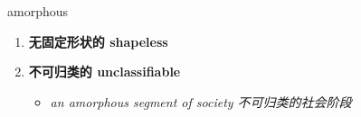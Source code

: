 
\begin{frame}
{\huge amorphous}
\begin{center}
\begin{enumerate}\Large
  \item \textbf{无固定形状的 shapeless}
  \item \textbf{不可归类的 unclassifiable}
  \begin{itemize}
    \item \em{\Large{an amorphous segment of society 不可归类的社会阶段}}
  \end{itemize}
\end{enumerate}
\end{center}
\end{frame}
